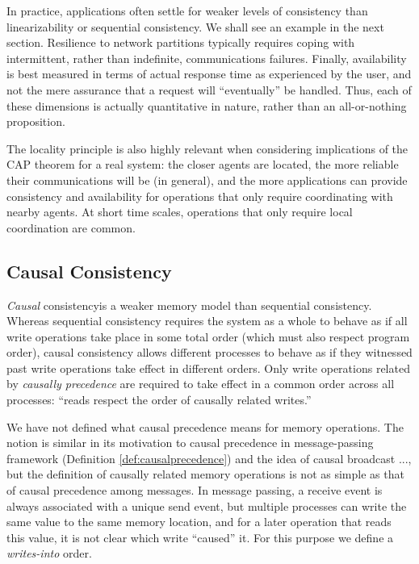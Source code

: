 \documentclass[]             %
{NASA}                       %
\theoremstyle{definition}
\begin{document}
In practice, applications often settle for weaker levels of
consistency than linearizability or sequential consistency. We shall
see an example in the next section. Resilience to network partitions
typically requires coping with intermittent, rather than indefinite,
communications failures. Finally, availability is best measured in
terms of actual response time as experienced by the user, and not the
mere assurance that a request will ``eventually'' be handled. Thus,
each of these dimensions is actually quantitative in nature, rather
than an all-or-nothing proposition.

The locality principle is also highly relevant when considering
implications of the CAP theorem for a real system: the closer agents
are located, the more reliable their communications will be (in
general), and the more applications can provide consistency and
availability for operations that only require coordinating with nearby
agents. At short time scales, operations that only require local
coordination are common.

\subsection{Causal Consistency}
\emph{Causal} consistency\citationneeded is a weaker memory model than
sequential consistency. Whereas sequential consistency requires the
system as a whole to behave as if all write operations take place in
some total order (which must also respect program order), causal
consistency allows different processes to behave as if they witnessed
past write operations take effect in different orders. Only write
operations related by \emph{causally precedence} are required to take
effect in a common order across all processes: ``reads respect the
order of causally related writes.'' \citationneeded

We have not defined what causal precedence means for memory
operations. The notion is similar in its motivation to causal
precedence in message-passing framework (Definition
\ref{def:causalprecedence}) and the idea of causal broadcast
\citationneeded..., but the definition of causally related memory
operations is not as simple as that of causal precedence among
messages. In message passing, a receive event is always associated
with a unique send event, but multiple processes can write the same
value to the same memory location, and for a later operation that
reads this value, it is not clear which write ``caused'' it. For this
purpose we define a \emph{writes-into} order.
\end{document}
